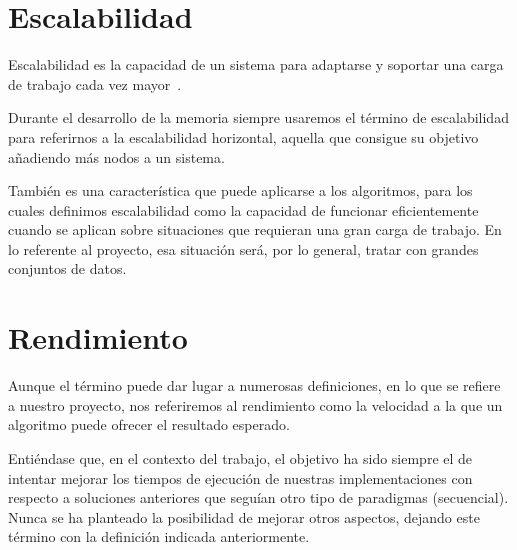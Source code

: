 \section{Escalabilidad}\label{sec:DefEscalabilidad}

Escalabilidad es la capacidad de un sistema para adaptarse y soportar una carga de trabajo cada vez mayor~\cite{Bondi:2000}.

Durante el desarrollo de la memoria siempre usaremos el término de escalabilidad para referirnos a la escalabilidad horizontal, aquella que consigue su objetivo añadiendo más nodos a un sistema.

También es una característica que puede aplicarse a los algoritmos, para los cuales definimos escalabilidad como la capacidad de funcionar eficientemente cuando se aplican sobre situaciones que requieran una gran carga de trabajo. En lo referente al proyecto, esa situación será, por lo general, tratar con grandes conjuntos de datos.

\section{Rendimiento}\label{sec:Rendimiento}

Aunque el término puede dar lugar a numerosas definiciones, en lo que se refiere a nuestro proyecto, nos referiremos al rendimiento como la velocidad a la que un algoritmo puede ofrecer el resultado esperado.

Entiéndase que, en el contexto del trabajo, el objetivo ha sido siempre el de intentar mejorar los tiempos de ejecución de nuestras implementaciones con respecto a soluciones anteriores que seguían otro tipo de paradigmas (secuencial). Nunca se ha planteado la posibilidad de mejorar otros aspectos, dejando este término con la definición indicada anteriormente.


